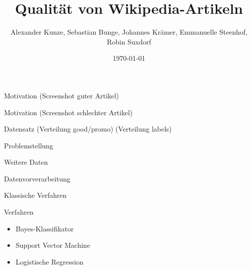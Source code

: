 \documentclass[aspectratio=169]{beamer} %
\title{Qualität von Wikipedia-Artikeln}
\author[]{Alexander Kunze, Sebastian Bunge, Johannes Krämer, Emmanuelle Steenhof, Robin Suxdorf}
\institute{Artificial Intelligence Group,\\
University of Hagen, Germany}
\date{\today}
\begin{document}




\begin{frame}
    \titlepage
\end{frame}
\nologo

\begin{frame}{Motivation}
    (Screenshot guter Artikel)
\end{frame}

\begin{frame}{Motivation}
    (Screenshot schlechter Artikel)
\end{frame}

\begin{frame}{Datensatz}
    (Verteilung good/promo)
    (Verteilung labels)
\end{frame}

\begin{frame}{Problemstellung}
    
\end{frame}

\begin{frame}{Weitere Daten}
    
\end{frame}

\begin{frame}{Datenvorverarbeitung}
    
\end{frame}

\begin{frame}{Klassische Verfahren}

    \begin{block}{Verfahren}
        \begin{itemize}
            \item Bayes-Klassifikator
            \item Support Vector Machine
            \item Logistische Regression
        \end{itemize}
    \end{block}

\end{frame}
\end{document}
